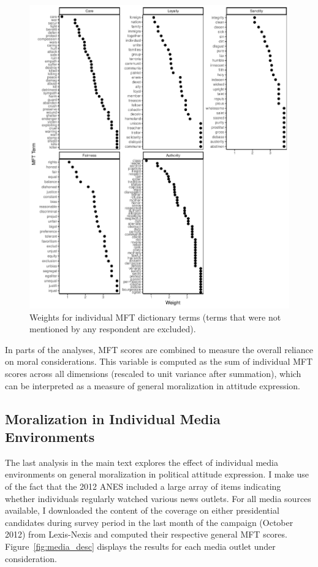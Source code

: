 \documentclass[12pt]{article}
\begin{document}
\begin{figure}[ht]\centering
\includegraphics{../calc/fig/app_mftweights.pdf}
\caption{Weights for individual MFT dictionary terms (terms that were not mentioned by any respondent are excluded).}\label{fig:mft_weights}
\end{figure}

In parts of the analyses, MFT scores are combined to measure the overall reliance on moral considerations. This variable is computed as the sum of individual MFT scores across all dimensions (rescaled to unit variance after summation), which can be interpreted as a measure of general moralization in attitude expression.


\clearpage
\subsection{Moralization in Individual Media Environments}

The last analysis in the main text explores the effect of individual media environments on general moralization in political attitude expression. I make use of the fact that the 2012 ANES included a large array of items indicating whether individuals regularly watched various news outlets. For all media sources available, I downloaded the content of the coverage on either presidential candidates during survey period in the last month of the campaign (October 2012) from Lexis-Nexis and computed their respective general MFT scores. Figure~\ref{fig:media_desc} displays the results for each media outlet under consideration.
\end{document}
